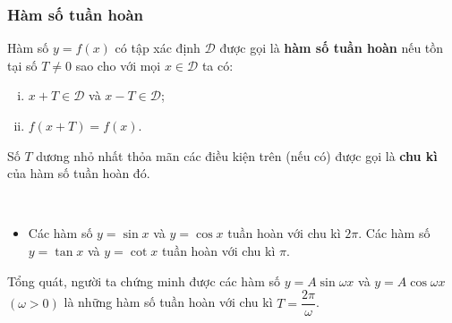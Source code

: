 \begin{tomtat}
	\subsubsection{Hàm số tuần hoàn}
	\begin{dn}
		Hàm số $y=f(x)$ có tập xác định $\mathscr{D}$ được gọi là \textbf{hàm số tuần hoàn} nếu tồn tại số $T \neq 0$ sao cho với mọi $x \in \mathscr{D}$ ta có:
		\begin{enumerate}[i)]
			\item $x+T \in \mathscr{D}$ và $x-T \in \mathscr{D}$;
			\item $f(x+T)=f(x)$.
		\end{enumerate}
		Số $T$ dương nhỏ nhất thỏa mãn các điều kiện trên (nếu có) được gọi là \textbf{chu kì} của hàm số tuần hoàn đó.
	\end{dn}
	\begin{nx}
		\
		\begin{itemize}
			\item  Các hàm số $y=\sin x$ và $y=\cos x$ tuần hoàn với chu kì $2 \pi$. Các hàm số $y=\tan x$ và $y=\cot x$ tuần hoàn với chu kì $\pi$.
		\end{itemize}
	\end{nx}
	\begin{note} 
		Tổng quát, người ta chứng minh được các hàm số $y=A \sin \omega x$ và $y=A \cos \omega x$ $(\omega>0)$ là những hàm số tuần hoàn với chu kì $T=\dfrac{2 \pi}{\omega}$.
	\end{note}

\end{tomtat}
